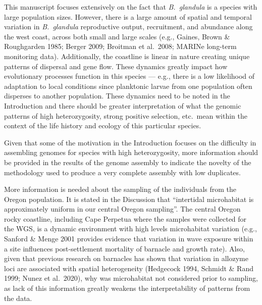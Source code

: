 
\begin{point}{} %
This manuscript focuses extensively on the fact that \emph{B.\ glandula}
is a species with large population sizes. However, there is a large
amount of spatial and temporal variation in \emph{B.\ glandula}
reproductive output, recruitment, and abundance along the west coast,
across both small and large scales (e.g., Gaines, Brown \& Roughgarden
1985; Berger 2009; Broitman et al.\ 2008; MARINe long-term monitoring
data). Additionally, the coastline is linear in nature creating unique
patterns of dispersal and gene flow. These dynamics greatly impact how
evolutionary processes function in this species --- e.g., there is a low
likelihood of adaptation to local conditions since planktonic larvae
from one population often disperses to another population. These dynamics
need to be noted in the Introduction and there should be greater
interpretation of what the genomic patterns of high heterozygosity,
strong positive selection, etc.\ mean within the context of the life
history and ecology of this particular species.
\end{point}


\begin{point}{} %
Given that some of the motivation in the Introduction focuses on the
difficulty in assembling genomes for species with high heterozygosity,
more information should be provided in the results of the genome assembly
to indicate the novelty of the methodology used to produce a very
complete assembly with low duplicates.
\end{point}


\begin{point}{} %
More information is needed about the sampling of the individuals from
the Oregon population. It is stated in the Discussion that ``intertidal
microhabitat is approximately uniform in our central Oregon sampling''.
The central Oregon rocky coastline, including Cape Perpetua where the
samples were collected for the WGS, is a dynamic environment with high
levels microhabitat variation (e.g., Sanford \& Menge 2001 provides
evidence that variation in wave exposure within a site influences
post-settlement mortality of barnacle and growth rate). Also, given that
previous research on barnacles has shown that variation in allozyme loci
are associated with spatial heterogeneity (Hedgecock 1994, Schmidt \&
Rand 1999; Nunez et al.\ 2020), why was microhabitat not considered prior
to sampling, as lack of this information greatly weakens the
interpretability of patterns from the data.
\end{point}

